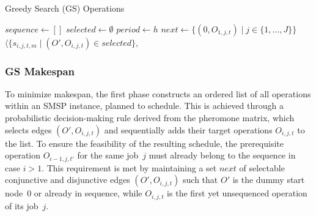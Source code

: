\documentclass[runningheads]{llncs}
\begin{document}
\begin{algorithm}[t]
	\caption{Greedy Search (GS) Operations}
	\label{gs-o}
	$\mathit{sequence}\leftarrow[]$\;
	$\mathit{selected}\leftarrow\emptyset$\;
	$\mathit{period}\leftarrow{h}$\;
	$\mathit{next}\leftarrow\{(0,O_{1,j,t}) \mid j\in\{1,\dots,J\}\}$\;
	\While{$\mathit{next}\neq\emptyset$}{
		\lForEach{$e\in\mathit{next}$}{%
		$p_e\leftarrow \frac{\tau_e}{\sum_{e'\in\mathit{next}}\tau_{e'}}$}
	Randomly select an edge $e$ based on $p_e$\;
	$\mathit{end time}\leftarrow{e}$\;
	\For{selected edge $e=(O',O_{i,j,t})$}{
		$\mathit{e}\leftarrow{start time + process time}$\;
		\If{$\mathit{e}<{period}$}{countinue}
		$\mathit{sequence}.\mathrm{enqueue}(O_{i,j,t})$\;
		$\mathit{selected}\leftarrow\mathit{selected}\cup\{e\}$\;
		$\mathit{next}\leftarrow\{(O_1,O_2)\in\mathit{next} \mid O_2\neq O_{i,j,t}\}$\;
		$\begin{array}{@{}r@{}l@{}}
			E \leftarrow {} &		
			\{(O_{i,j,t},O_{{i+1},j,t'}) \mid i<n_j\}
			\\ {} \cup {} &
			\{(O_{i,j,t},O_{i',j',t}) \mid (O_1,O_{i',j',t})\in\mathit{next}\}\text{\;}
		\end{array}$
		$\mathit{next}\leftarrow\mathit{next}\cup E$\;
		}}
		\Return $\langle\{s_{i,j,t,m} \mid (O',O_{i,j,t})\in\mathit{selected}\},{}$
\end{algorithm}

\subsubsection{GS Makespan}
To minimize makespan, the first phase constructs an ordered list of all operations within an SMSP instance, planned to schedule. This is achieved through a probabilistic decision-making rule derived from the pheromone matrix, which selects edges $(O',O_{i,j,t})$ and sequentially adds their target operations 
$O_{i,j,t}$ to the list. To ensure the feasibility of the resulting schedule, the prerequisite operation 
$O_{i-1,j,t'}$ for the same job~$j$ must already belong to the sequence in case $i>1$. 
This requirement is met by maintaining a set  $\mathit{next}$
of selectable conjunctive and disjunctive edges $(O',O_{i,j,t})$
such that $O'$ is the dummy start node~$0$ or already in sequence,
while $O_{i,j,t}$ is the first yet unsequenced operation of its job~$j$. 
\end{document}
